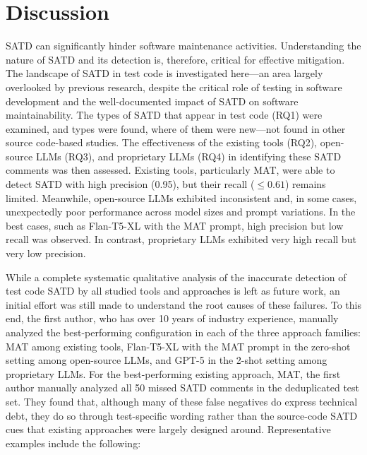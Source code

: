 
\section{Discussion}\label{sec:td-discussion}
SATD can significantly hinder software maintenance activities. Understanding the nature of SATD and its detection is, therefore, critical for effective mitigation. The landscape of SATD in test code is investigated here—an area largely overlooked by previous research, despite the critical role of testing in software development and the well-documented impact of SATD on software maintainability. The types of SATD that appear in test code (RQ1) were examined, and \categoryCount{} types were found, where \newCategoryCount{} of them were new---not found in other source code-based studies. The effectiveness of the existing tools (RQ2), open-source LLMs (RQ3), and proprietary LLMs (RQ4) in identifying these SATD comments was then assessed. Existing tools, particularly MAT, were able to detect SATD with high precision (0.95), but their recall ($\leq 0.61$) remains limited. Meanwhile, open-source LLMs exhibited inconsistent and, in some cases, unexpectedly poor performance across model sizes and prompt variations. In the best cases, such as Flan-T5-XL with the MAT prompt, high precision but low recall was observed. In contrast, proprietary LLMs exhibited very high recall but very low precision.

While a complete systematic qualitative analysis of the inaccurate detection of test code SATD by all studied tools and approaches is left as future work, an initial effort was still made to understand the root causes of these failures. To this end, the first author, who has over 10 years of industry experience, manually analyzed the best-performing configuration in each of the three approach families: MAT among existing tools, Flan-T5-XL with the MAT prompt in the zero-shot setting among open-source LLMs, and GPT-5 in the 2-shot setting among proprietary LLMs. For the best-performing existing approach, MAT, the first author manually analyzed all 50 missed SATD comments in the deduplicated test set. They found that, although many of these false negatives do express technical debt, they do so through test-specific wording rather than the source-code SATD cues that existing approaches were largely designed around. Representative examples include the following:

